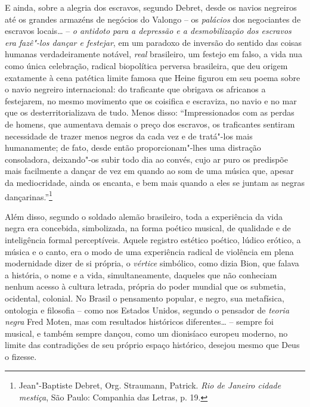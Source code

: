 E ainda, sobre a alegria dos escravos, segundo Debret, desde os navios
negreiros até os grandes armazéns de negócios do Valongo -- os
\emph{palácios} dos negociantes de escravos locais\ldots{}­ -- \emph{o
antidoto para a depressão e a desmobilização dos escravos era fazê"-los
dançar e festejar}, em um paradoxo de inversão do sentido das coisas
humanas verdadeiramente notável, \emph{real} brasileiro, um festejo em
falso, a vida nua como única celebração, radical biopolítica perversa
brasileira, que deu origem exatamente à cena patética limite famosa que
Heine figurou em seu poema sobre o navio negreiro internacional: do
traficante que obrigava os africanos a festejarem, no mesmo movimento
que os coisifica e escraviza, no navio e no mar que os
desterritorializava de tudo. Menos disso: ``Impressionados com as perdas
de homens, que aumentava demais o preço dos escravos, os traficantes
sentiram necessidade de trazer menos negros da cada vez e de tratá"-los
mais humanamente; de fato, desde então proporcionam"-lhes uma distração
consoladora, deixando"-os subir todo dia ao convés, cujo ar puro os
predispõe mais facilmente a dançar de vez em quando ao som de uma música
que, apesar da mediocridade, ainda os encanta, e bem mais quando a eles
se juntam as negras dançarinas.''\footnote{Jean"-Baptiste Debret, Org.
  Straumann, Patrick. \emph{Rio de Janeiro cidade mestiça}, São Paulo:
  Companhia das Letras, p. 19.}

Além disso, segundo o soldado alemão brasileiro, toda a experiência da
vida negra era concebida, simbolizada, na forma poético musical, de
qualidade e de inteligência formal perceptíveis. Aquele registro
estético poético, lúdico erótico, a música e o canto, era o modo de uma
experiência radical de violência em plena modernidade dizer de si
própria, o \emph{vértice} simbólico, como dizia Bion, que falava a
história, o nome e a vida, simultaneamente, daqueles que não conheciam
nenhum acesso à cultura letrada, própria do poder mundial que os
submetia, ocidental, colonial. No Brasil o pensamento popular, e negro,
sua metafísica, ontologia e filosofia -- como nos Estados Unidos,
segundo o pensador de \emph{teoria negra} Fred Moten, mas com resultados
históricos diferentes\ldots{} -- sempre foi musical, e também sempre dançou,
como um dionisíaco europeu moderno, no limite das contradições de seu
próprio espaço histórico, desejou mesmo que Deus o fizesse.

